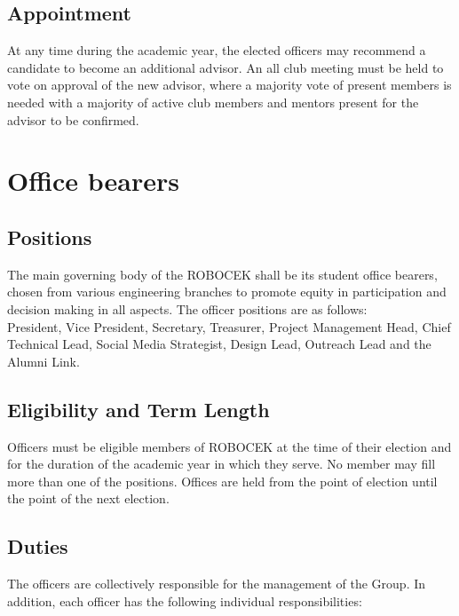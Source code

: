 \subsection{Appointment}
At any time during the academic year, the elected officers may
recommend a candidate to become an additional advisor. An all club
meeting must be held to vote on approval of the new advisor, where a
majority vote of present members is needed with a majority of active club
members and mentors present for the advisor to be confirmed.

\section{Office bearers}

\subsection{Positions}
The main governing body of the ROBOCEK shall be its student office
bearers, chosen from various engineering branches to promote equity in
participation and decision making in all aspects. The officer positions are
as follows:
\\

President, Vice President, Secretary, Treasurer, Project Management
Head, Chief Technical Lead, Social Media Strategist, Design Lead,
Outreach Lead and the Alumni Link.

\subsection{Eligibility and Term Length}
Officers must be eligible members of ROBOCEK at the time of their
election and for the duration of the academic year in which they serve. No
member may fill more than one of the positions.
Offices are held from the point of election until the point of the next
election.

\subsection{Duties}
The officers are collectively responsible for the management of the Group.
In addition, each officer has the following individual responsibilities:

